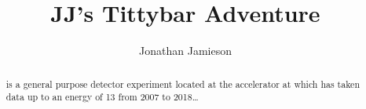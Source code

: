 \documentclass[hyperpdf,nobind,oneside]{hepthesis}
\title{JJ's Tittybar Adventure}
\author{Jonathan Jamieson}
\begin{document}
\begin{abstract}
  \ATLAS is a general purpose detector experiment located at the \LHC accelerator at \CERN which has taken data up to an energy of \unit{13}{\TeV} from 2007 to 2018\dots
\end{abstract}

\begin{mainmatter}
  
  
\end{mainmatter}

\begin{appendices}
  
\end{appendices}

\end{document}
